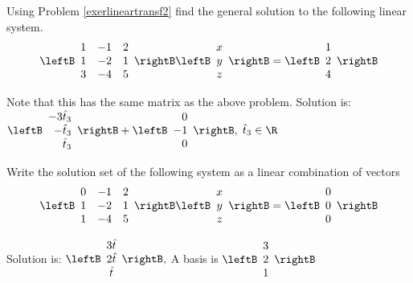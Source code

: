 \begin{enumialphparenastyle}
\begin{ex} Using Problem \ref{exerlineartransf2} find the general solution to the following 
linear system.
\begin{equation*}
\leftB
\begin{array}{rrr}
1 & -1 & 2 \\
1 & -2 & 1 \\
3 & -4 & 5
\end{array}
\rightB \leftB
\begin{array}{c}
x \\
y \\
z
\end{array}
\rightB =\leftB
\begin{array}{r}
1 \\
2 \\
4
\end{array}
\rightB 
\end{equation*}
\begin{sol}
Note that this has the same matrix as the above problem. Solution is: $%
\leftB
\begin{array}{r}
-3\hat{t}_{3} \\
-\hat{t}_{3} \\
\hat{t}_{3}
\end{array}
\rightB +\leftB
\begin{array}{r}
0 \\
-1 \\
0
\end{array}
\rightB ,$ $\hat{t}_{3}\in \R$
\end{sol}
\end{ex}

\begin{ex} \label{exerlineartransf3}Write the solution set of the following system as a linear combination of vectors
\begin{equation*}
\leftB
\begin{array}{rrr}
0 & -1 & 2 \\
1 & -2 & 1 \\
1 & -4 & 5
\end{array}
\rightB \leftB
\begin{array}{c}
x \\
y \\
z
\end{array}
\rightB =\leftB
\begin{array}{r}
0 \\
0 \\
0
\end{array}
\rightB 
\end{equation*}
\begin{sol}
Solution is: $\leftB
\begin{array}{c}
3\hat{t} \\
2\hat{t} \\
\hat{t}
\end{array}
\rightB ,$ A basis is $\leftB
\begin{array}{c}
3 \\
2 \\
1
\end{array}
\rightB $
\end{sol}
\end{ex}


\end{enumialphparenastyle}
